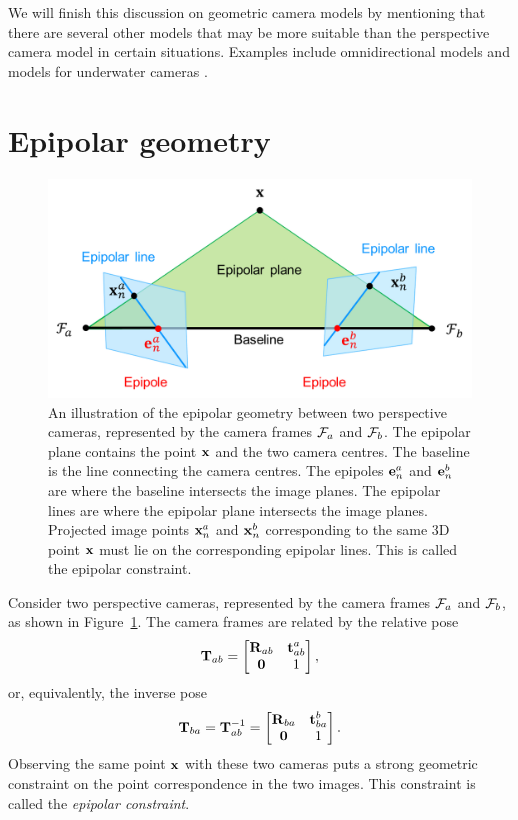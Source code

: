 We will finish this discussion on geometric camera models by mentioning that there are several other models that may be more suitable than the perspective camera model in certain situations.
Examples include omnidirectional models \cite{Caruso2015Large-scaleCameras, Barreto2006UnifyingCameras} and models for underwater cameras \cite{uczynski2017TheHousings}.

\section{Epipolar geometry} \label{sec:epipolar-geometry}
\begin{figure}[htb]
    \centering
    \includegraphics[width=0.75\columnwidth]{figures/epipolar-geometry.png}
    \caption{An illustration of the epipolar geometry between two perspective cameras, represented by the camera frames $\mathcal{F}_a$ and $\mathcal{F}_b$.
    The epipolar plane contains the point ${\boldsymbol{\mathbf{x}}}$ and the two camera centres.
    The baseline is the line connecting the camera centres.
    The epipoles ${\boldsymbol{\mathbf{e}}}^a_n$ and ${\boldsymbol{\mathbf{e}}}^b_n$ are where the baseline intersects the image planes.
    The epipolar lines are where the epipolar plane intersects the image planes.
    Projected image points ${\boldsymbol{\mathbf{x}}}^a_n$ and ${\boldsymbol{\mathbf{x}}}^b_n$ corresponding to the same 3D point ${\boldsymbol{\mathbf{x}}}$ must lie on the corresponding epipolar lines.
    This is called the epipolar constraint.
    }
    \label{fig:epipolar-geometry}
\end{figure}
Consider two perspective cameras, represented by the camera frames $\mathcal{F}_a$ and $\mathcal{F}_b$, as shown in Figure~\ref{fig:epipolar-geometry}.
The camera frames are related by the relative pose
\begin{equation} \label{eq:epipolar-pose-ab}
  {\boldsymbol{\mathbf{T}}}_{ab} =
  \begin{bmatrix}
    {\boldsymbol{\mathbf{R}}}_{ab} & {\boldsymbol{\mathbf{t}}}^a_{ab}\\
    \boldsymbol{\mathbf{0}} & 1
  \end{bmatrix},
\end{equation}
or, equivalently, the inverse pose
\begin{equation}
  {\boldsymbol{\mathbf{T}}}_{ba} = {\boldsymbol{\mathbf{T}}}_{ab}^{-1} =
  \begin{bmatrix}
    {\boldsymbol{\mathbf{R}}}_{ba} & {\boldsymbol{\mathbf{t}}}^b_{ba}\\
    \boldsymbol{\mathbf{0}} & 1
  \end{bmatrix}.
\end{equation}
Observing the same point ${\boldsymbol{\mathbf{x}}}$ with these two cameras puts a strong geometric constraint on the point correspondence in the two images.
This constraint is called the \emph{epipolar constraint}.

